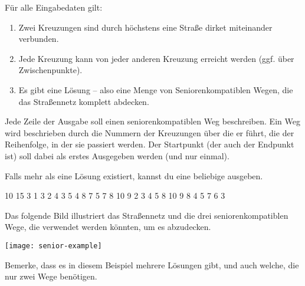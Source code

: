 \documentclass{boi2014-de}
\begin{document}
    Für alle Eingabedaten gilt:
    \begin{enumerate}
        \item Zwei Kreuzungen sind durch höchstens eine Straße dirket miteinander verbunden.
        \item Jede Kreuzung kann von jeder anderen Kreuzung erreicht werden (ggf. über Zwischenpunkte).
        \item Es gibt eine Lösung -- also eine Menge von Seniorenkompatiblen Wegen, die das Straßennetz komplett abdecken.
    \end{enumerate}

    \Output
    Jede Zeile der Ausgabe soll einen seniorenkompatiblen Weg beschreiben.
    Ein Weg wird beschrieben durch die Nummern der Kreuzungen über die er führt, die der Reihenfolge, in der sie passiert werden.
    Der Startpunkt (der auch der Endpunkt ist) soll dabei als erstes Ausgegeben werden (und nur einmal).
    
    Falls mehr als eine Lösung existiert, kannst du eine beliebige ausgeben.

    \Example

    \example
    {
        10 15  3  1 3  2 4  3 5  4 8  7  5 7  8  10  9
    }
    {
        2 3 4 5 8 10 9  8 4  5 7 6 3
    }
    {
        Das folgende Bild illustriert das Straßennetz und die drei seniorenkompatiblen Wege, die verwendet werden könnten, um es abzudecken.

        \texttt{[image: senior-example]}

        Bemerke, dass es in diesem Beispiel mehrere Lösungen gibt, und auch welche, die nur zwei Wege benötigen.    
    }
\end{document}
